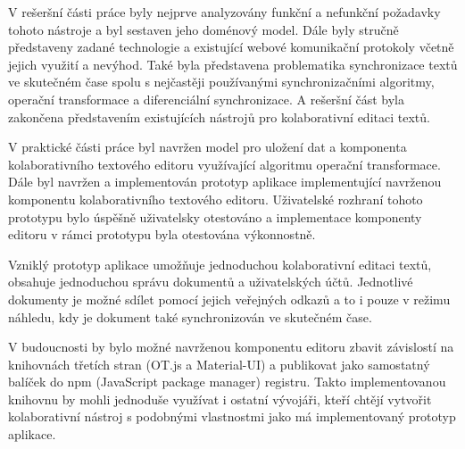 
\begin{conclusion}

    V rešeršní části práce byly nejprve analyzovány funkční a nefunkční požadavky tohoto nástroje a byl sestaven jeho doménový model.
    Dále byly stručně představeny zadané technologie a existující webové komunikační protokoly včetně jejich využití a nevýhod.
    Také byla představena problematika synchronizace textů ve skutečném čase spolu s nejčastěji používanými synchronizačními algoritmy, operační transformace a diferenciální synchronizace.
    A rešeršní část byla zakončena představením existujících nástrojů pro kolaborativní editaci textů.

    V praktické části práce byl navržen model pro uložení dat a komponenta kolaborativního textového editoru využívající algoritmu operační transformace.
    Dále byl navržen a implementován prototyp aplikace implementující navrženou komponentu kolaborativního textového editoru.
    Uživatelské rozhraní tohoto prototypu bylo úspěšně uživatelsky otestováno a implementace komponenty editoru v rámci prototypu byla otestována výkonnostně.

    Vzniklý prototyp aplikace umožňuje jednoduchou kolaborativní editaci textů, obsahuje jednoduchou správu dokumentů a uživatelských účtů.
    Jednotlivé dokumenty je možné sdílet pomocí jejich veřejných odkazů a to i pouze v režimu náhledu, kdy je dokument také synchronizován ve skutečném čase.

    V budoucnosti by bylo možné navrženou komponentu editoru zbavit závislostí na knihovnách třetích stran (OT.js a Material-UI) a publikovat jako samostatný balíček do npm (JavaScript package manager) registru.
    Takto implementovanou knihovnu by mohli jednoduše využívat i ostatní vývojáři, kteří chtějí vytvořit kolaborativní nástroj s podobnými vlastnostmi jako má implementovaný prototyp aplikace.

\end{conclusion}
